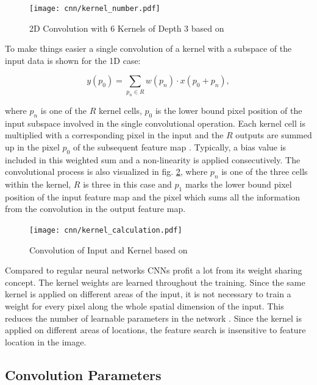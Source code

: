\begin{figure}[H]
  \centering
  \texttt{[image: cnn/kernel\_number.pdf]}
  \caption {2D Convolution with 6 Kernels of Depth 3 based on \cite{Ganesh2019}}
  \label{fig:kernel_number}
\end{figure}

To make things easier a single convolution of a kernel with a subspace of the input data is shown for the 1D case:

\begin{equation}
  y(p_{0}) = \sum_{p_{n} \in R} w(p_{n}) \cdot x(p_{0} + p_{n}), 
  \label{eq:kernel}
\end{equation}

where $p_{n}$ is one of the $R$ kernel cells, $p_{0}$ is the lower bound pixel position of the input subspace involved in the single convolutional operation. Each kernel cell is multiplied with a corresponding pixel in the input and the $R$ outputs are summed up in the pixel $p_{0}$ of the subsequent feature map \cite{Ganesh2019}. Typically, a bias value is included in this weighted sum and a non-linearity is applied consecutively. The convolutional process is also visualized in fig. \ref{fig:kernel}, where $p_{n}$ is one of the three cells within the kernel, $R$ is three in this case and $p_{1}$ marks the lower bound pixel position of the input feature map and the pixel which sums all the information from the convolution in the output feature map.


\begin{figure}[H]
  \centering
  \texttt{[image: cnn/kernel\_calculation.pdf]}
  \caption {Convolution of Input and Kernel based on \cite{Ganesh2019}}
  \label{fig:kernel}
\end{figure}

Compared to regular neural networks CNNs profit a lot from its weight sharing concept. The kernel weights are learned throughout the training. Since the same kernel is applied on different areas of the input, it is not necessary to train a weight for every pixel along the whole spatial dimension of the input. This reduces the number of learnable parameters in the network \cite{OShea2015}. Since the kernel is applied on different areas of locations, the feature search is insensitive to feature location in the image.

\subsection{Convolution Parameters}

